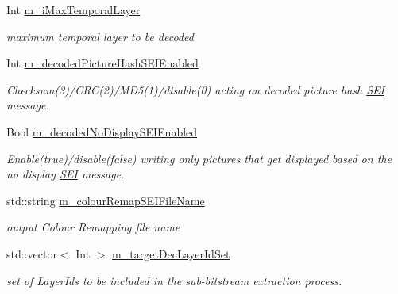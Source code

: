 \begin{DoxyCompactItemize}
\item 
\mbox{\label{class_t_app_dec_cfg_adfbca0a39ab597d661d79699add3c176}} 
Int \hyperlink{class_t_app_dec_cfg_adfbca0a39ab597d661d79699add3c176}{m\+\_\+i\+Max\+Temporal\+Layer}
\begin{DoxyCompactList}\small\item\em maximum temporal layer to be decoded \end{DoxyCompactList}\item 
\mbox{\label{class_t_app_dec_cfg_a305eaca1ee22d9d5ed58c42c98fd1cc2}} 
Int \hyperlink{class_t_app_dec_cfg_a305eaca1ee22d9d5ed58c42c98fd1cc2}{m\+\_\+decoded\+Picture\+Hash\+S\+E\+I\+Enabled}
\begin{DoxyCompactList}\small\item\em Checksum(3)/\+C\+RC(2)/\+M\+D5(1)/disable(0) acting on decoded picture hash \hyperlink{class_s_e_i}{S\+EI} message. \end{DoxyCompactList}\item 
\mbox{\label{class_t_app_dec_cfg_ab7a15e455ed67daf2bcadee72d0f5b75}} 
Bool \hyperlink{class_t_app_dec_cfg_ab7a15e455ed67daf2bcadee72d0f5b75}{m\+\_\+decoded\+No\+Display\+S\+E\+I\+Enabled}
\begin{DoxyCompactList}\small\item\em Enable(true)/disable(false) writing only pictures that get displayed based on the no display \hyperlink{class_s_e_i}{S\+EI} message. \end{DoxyCompactList}\item 
\mbox{\label{class_t_app_dec_cfg_afa502d8af1679bde9baf41e35e791d13}} 
std\+::string \hyperlink{class_t_app_dec_cfg_afa502d8af1679bde9baf41e35e791d13}{m\+\_\+colour\+Remap\+S\+E\+I\+File\+Name}
\begin{DoxyCompactList}\small\item\em output Colour Remapping file name \end{DoxyCompactList}\item 
\mbox{\label{class_t_app_dec_cfg_a36f70e3c8762abf741aa35784393bcb7}} 
std\+::vector$<$ Int $>$ \hyperlink{class_t_app_dec_cfg_a36f70e3c8762abf741aa35784393bcb7}{m\+\_\+target\+Dec\+Layer\+Id\+Set}
\begin{DoxyCompactList}\small\item\em set of Layer\+Ids to be included in the sub-\/bitstream extraction process. \end{DoxyCompactList}\item 

\end{DoxyCompactItemize}
